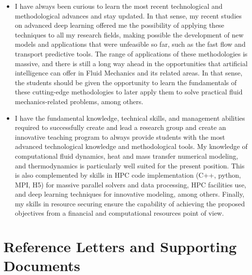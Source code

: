 \documentclass{article}
\begin{document}
\begin{itemize}
\item I have always been curious to learn the most recent technological and methodological advances and stay updated. In that sense, my recent studies on advanced deep learning offered me the possibility of applying these techniques to all my research fields, making possible the development of new models and applications that were unfeasible so far, such as the fast flow and transport predictive tools. The range of applications of these methodologies is massive, and there is still a long way ahead in the opportunities that artificial intelligence can offer in Fluid Mechanics and its related areas. In that sense, the students should be given the opportunity to learn the fundamentals of these cutting-edge methodologies to later apply them to solve practical fluid mechanics-related problems, among others.      

\item I have the fundamental knowledge, technical skills, and management abilities required to successfully create and lead a research group and create an innovative teaching program to always provide students with the most advanced technological knowledge and methodological tools. My knowledge of computational fluid dynamics, heat and mass transfer numerical modeling, and thermodynamics is particularly well suited for the present position. This is also complemented by skills in HPC code implementation (C++, python, MPI, H5) for massive parallel solvers and data processing, HPC facilities use, and deep learning techniques for innovative modeling, among others. Finally, my skills in resource securing ensure the capability of achieving the proposed objectives from a financial and computational resources point of view.
\end{itemize}

\newpage
\section{Reference Letters and Supporting Documents}
\end{document}
